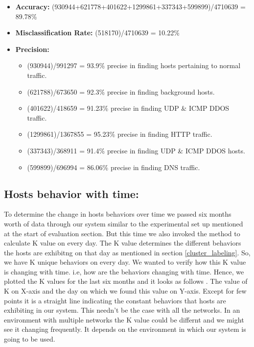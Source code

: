 \begin{itemize}
	\item \textbf{Accuracy:}  (930944+621778+401622+1299861+337343+599899)/4710639 = 89.78\%
	
	\item \textbf{Misclassification Rate:} (518170)/4710639 = 10.22\%
	
	\item \textbf{Precision:} 
	\begin{itemize}			
		
		\item (930944)/991297 = 93.9\% precise in finding hosts pertaining to normal traffic.
		
		\item (621788)/673650 = 92.3\% precise in finding background hosts.
		
		\item (401622)/418659 = 91.23\% precise in finding UDP \& ICMP DDOS traffic.
		
		\item (1299861)/1367855 = 95.23\% precise in finding HTTP traffic.
		
		\item (337343)/368911 = 91.4\% precise in finding UDP \& ICMP DDOS hosts.
		
		\item (599899)/696994 = 86.06\% precise in finding DNS traffic.
	\end{itemize}
	
\end{itemize}



\subsection{Hosts behavior with time:}

To determine the change in hosts behaviors over time we passed six months worth of data through our system similar to the experimental set up mentioned at the start of evaluation section. But this time we also invoked the method to calculate K value on every day. The K value determines the different behaviors the hosts are exhibitng on that day as mentioned in section \ref{cluster_labeling}. So, we have K unique behaviors on every day. We wanted to verify how this K value is changing with time. i.e, how are the behaviors changing with time. Hence, we plotted the K values for the last six months and it looks as follows . The value of K on X-axis and the day on which we found this value on Y-axis. Except for few points it is a straight line indicating the constant behaviors that hosts are exhibiting in our system. This needn't be the case with all the networks. In an environment with multiple networks the K value could be differnt and we might see it changing frequently. It depends on the environment in which our system is going to be used.

